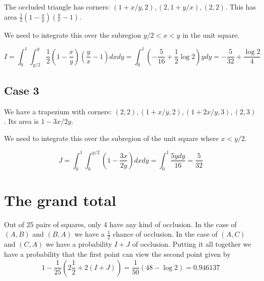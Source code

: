 \documentclass[12pt]{article}
\begin{document}
The occluded triangle has corners: $(1+x/y,2), (2,1+y/x), (2,2)$.
This has area $\frac{1}{2}\left(1-\frac{x}{y}\right)\left(\frac{y}{x}-1\right)$.

We need to integrate this over the subregion $y/2<x<y$ in the unit square.

\[
I =
\int_0^1 \int_{y/2}^y \frac{1}{2}\left(1-\frac{x}{y}\right)\left(\frac{y}{x}-1\right)  dxdy
= \int_0^1 \left(-\frac{5}{16}+\frac{1}{2}\log 2\right)y  dy
= -\frac{5}{32}+\frac{\log 2}{4}
\]

\subsection{Case 3}
\begin{center}
\end{center}

We have a trapezium with corners: $(2,2), (1+x/y,2), (1+2x/y,3), (2,3)$.
Its area is $1-3x/2y$.

We need to integrate this over the subregion of the unit square where $x < y/2$.

\[
J =
\int_0^1 \int_0^{y/2} \left(1-\frac{3x}{2y}\right) dxdy
= \int_0^1 \frac{5ydy}{16}
= \frac{5}{32}
\]

\section{The grand total}
Out of 25 pairs of squares, only 4 have any kind of occlusion.
In the case of $(A,B)$ and $(B,A)$ we have a $\frac{1}{2}$ chance of occlusion.
In the case of $(A,C)$ and $(C,A)$ we have a probability $I+J$ of occlusion.
Putting it all together we have a probability that the first point can view the second point given by
\[
1-\frac{1}{25}(2\frac{1}{2}+2(I+J)) = \frac{1}{50}(48-\log 2) = 0.946137
\]
\end{document}
